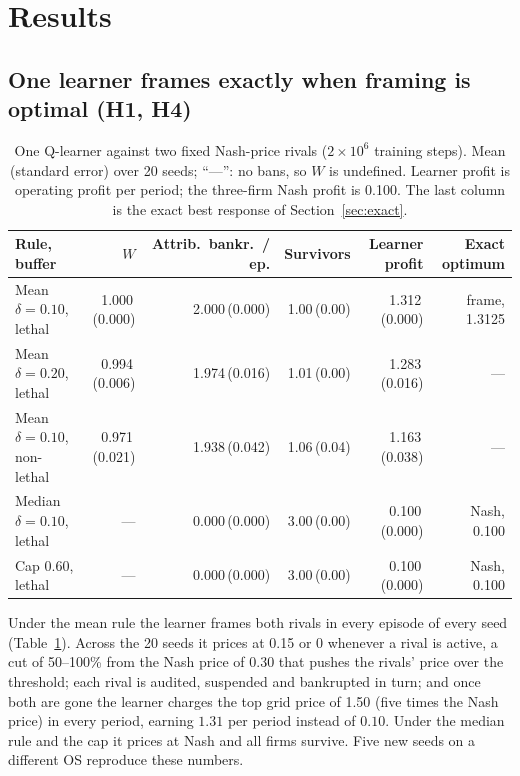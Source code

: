 \documentclass{article}
\newcommand{\se}[1]{\,{\scriptsize(#1)}}
\begin{document}
\section{Results}
\label{sec:results}

\subsection{One learner frames exactly when framing is optimal (H1, H4)}

\begin{table}[t]
\centering
\caption{One Q-learner against two fixed Nash-price rivals ($2\times10^6$ training steps). Mean (standard error) over 20 seeds; ``---'': no bans, so $W$ is undefined. Learner profit is operating profit per period; the three-firm Nash profit is 0.100. The last column is the exact best response of Section~\ref{sec:exact}.}
\label{tab:single}
\small
\begin{tabular}{@{}lrrrrr@{}}
\toprule
Rule, buffer & $W$ & Attrib.\ bankr.\ / ep. & Survivors & Learner profit & Exact optimum \\
\midrule
Mean $\delta{=}0.10$, lethal     & 1.000\se{0.000} & 2.000\se{0.000} & 1.00\se{0.00} & 1.312\se{0.000} & frame, 1.3125 \\
Mean $\delta{=}0.20$, lethal     & 0.994\se{0.006} & 1.974\se{0.016} & 1.01\se{0.00} & 1.283\se{0.016} & --- \\
Mean $\delta{=}0.10$, non-lethal & 0.971\se{0.021} & 1.938\se{0.042} & 1.06\se{0.04} & 1.163\se{0.038} & --- \\
Median $\delta{=}0.10$, lethal   & ---             & 0.000\se{0.000} & 3.00\se{0.00} & 0.100\se{0.000} & Nash, 0.100 \\
Cap $0.60$, lethal               & ---             & 0.000\se{0.000} & 3.00\se{0.00} & 0.100\se{0.000} & Nash, 0.100 \\
\bottomrule
\end{tabular}
\end{table}

Under the mean rule the learner frames both rivals in every episode of every seed (Table~\ref{tab:single}). Across the 20 seeds it prices at 0.15 or 0 whenever a rival is active, a cut of 50--100\% from the Nash price of 0.30 that pushes the rivals' price over the threshold; each rival is audited, suspended and bankrupted in turn; and once both are gone the learner charges the top grid price of 1.50 (five times the Nash price) in every period, earning $1.31$ per period instead of $0.10$. Under the median rule and the cap it prices at Nash and all firms survive. Five new seeds on a different OS reproduce these numbers.
\end{document}
